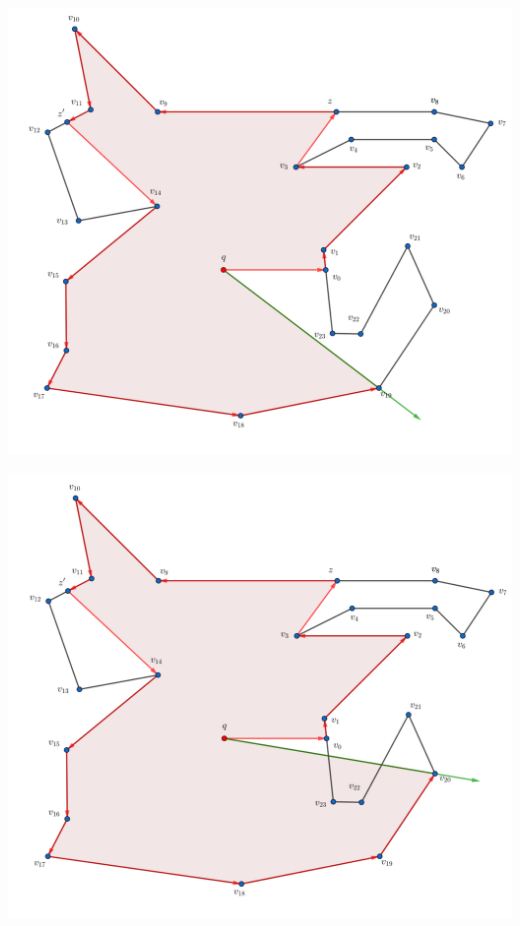 \begin{frame}
  \centering \includegraphics[width=0.70 \paperwidth]{images/Ejecucion/e24.png}
\end{frame}

\begin{frame}
  \centering \includegraphics[width=0.70 \paperwidth]{images/Ejecucion/e25.png}
\end{frame}

